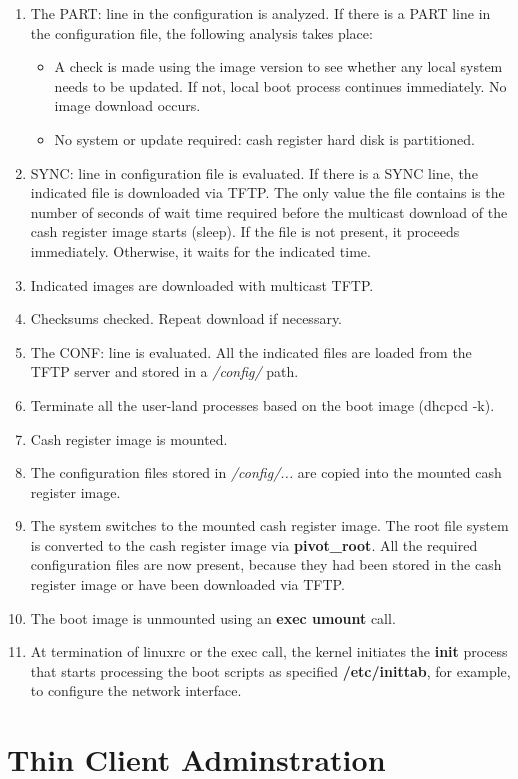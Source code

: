 \begin{enumerate}
      \item The PART: line in the configuration is analyzed. If there is a
            PART line in the configuration file, the following analysis
            takes place:
            \begin{itemize}
            \item A check is made using the image version to see whether any
                  local system needs to be updated. If not, local boot process
                  continues immediately. No image download occurs.
            \item No system or update required: cash register hard disk is
                  partitioned.
            \end{itemize}
      \item SYNC: line in configuration file is evaluated. If there is a
            SYNC line, the indicated file is downloaded via TFTP. The only
            value the file contains is the number of seconds of wait time
            required before the multicast download of the cash register image
            starts (sleep). If the file is not present, it proceeds
            immediately.  
            Otherwise, it waits for the indicated time.
      \item Indicated images are downloaded with multicast TFTP.
      \item Checksums checked. Repeat download if necessary.
      \item The CONF: line is evaluated. All the indicated files are loaded
            from the TFTP server and stored in a \textit{/config/} path.
      \item Terminate all the user-land processes based on the boot image
            (dhcpcd -k).
      \item Cash register image is mounted.
      \item The configuration files stored in \textit{/config/...} are copied
            into the mounted cash register image.
      \item The system switches to the mounted cash register image. The root
            file system is converted to the cash register image via
            \textbf{pivot\_root}. All the required configuration files are
            now present, because they had been stored in the cash register image
            or have been downloaded via TFTP.
      \item The boot image is unmounted using an \textbf{exec umount} call.
      \item At termination of linuxrc or the exec call, the kernel initiates
            the \textbf{init} process that starts processing the boot
            scripts as specified \textbf{/etc/inittab}, for example,
            to configure the network interface.
              \end{enumerate}

\newpage
\section{Thin Client Adminstration}

